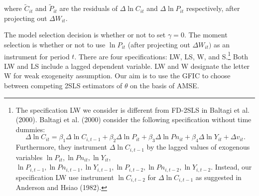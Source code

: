  where $\widetilde{C}_{it}$ and $\widetilde{P}_{it}$ are the residuals of $\Delta \ln C_{it}$ and $\Delta \ln P_{it}$ respectively, after projecting out $\Delta W_{it}$.
 
The model selection decision is whether or not to set $\gamma = 0$. The moment selection is whether or not to use $\ln P_{it}$ (after projecting out $\Delta W_{it})$ as an instrument for period $t$.  There are four specifications:  LW, LS, W, and S.\footnote{The specification LW we consider is different from FD-2SLS in Baltagi et al. (2000). Baltagi et al. (2000) consider the following specification without time dummies:
 \[
\Delta \ln C_{it} = \beta_1 \Delta \ln C_{i,t-1} +  \beta_2 \Delta \ln P_{it} +\beta_3 \Delta \ln Pn_{it} +  \beta_4 \Delta \ln Y_{it} + \Delta v_{it}.
\]
Furthermore, they instrument $\Delta \ln C_{i,t-1}$ by the lagged values of exogenous variables $\ln P_{it}, \ln Pn_{it}, \ln Y_{it},$ $\ln P_{i,t-1}, \ln Pn_{i,t-1}, \ln Y_{i,t-1}, \ln P_{i,t-2}, \ln Pn_{i,t-2}, \ln Y_{i,t-2}$. Instead, our specification LW use instrument $\ln C_{i, t-2}$ for $\Delta \ln C_{i,t-1}$ as suggested in Anderson and Hsiao (1982).}
 Both LW and LS include a lagged dependent variable. LW and W designate the letter W for weak exogeneity assumption. Our aim is to use the GFIC to choose between competing 2SLS estimators of $\theta$ on the basis of AMSE. 

